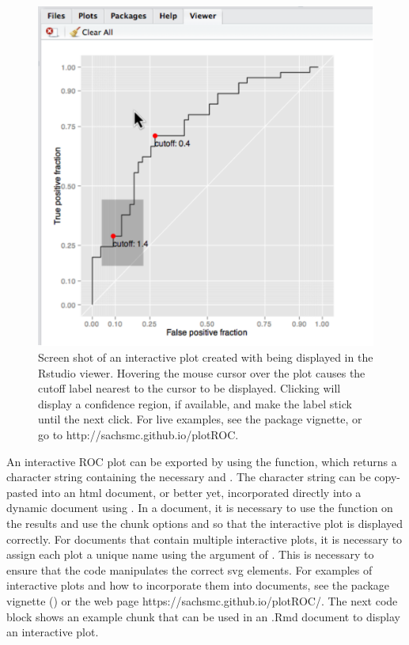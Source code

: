 \documentclass[codesnippet]{jss}
\begin{document}
\begin{figure}[ht]
\centering
\includegraphics{figure/screen-shot.pdf}
\caption{Screen shot of an interactive plot created with  being displayed in the Rstudio viewer. Hovering the mouse cursor over the plot causes the cutoff label nearest to the cursor to be displayed. Clicking will display a confidence region, if available, and make the label stick until the next click. For live examples, see the package vignette, or go to http://sachsmc.github.io/plotROC. \label{interact}}
\end{figure}

An interactive ROC plot can be exported by using the
 function, which returns a character string
containing the necessary  and . The
character string can be copy-pasted into an html document, or better
yet, incorporated directly into a dynamic document using 
\citep{knitr}. In a  document, it is necessary to use the
 function on the results and use the chunk options
 and  so that the
interactive plot is displayed correctly. For documents that contain
multiple interactive plots, it is necessary to assign each plot a unique
name using the  argument of .
This is necessary to ensure that the  code
manipulates the correct svg elements. For examples of interactive plots
and how to incorporate them into  documents, see the package
vignette () or the web
page https://sachsmc.github.io/plotROC/. The next code block shows an
example  chunk that can be used in an .Rmd document to
display an interactive plot.
\end{document}
